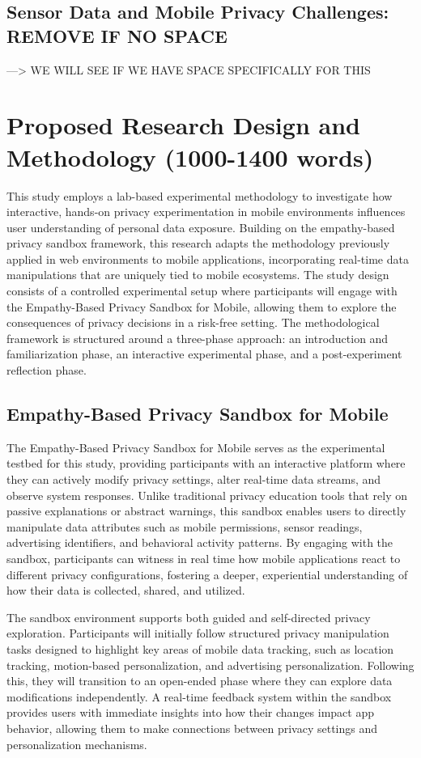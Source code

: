 \documentclass[acmlarge, nonacm]{acmart}
\begin{document}
\subsection{Sensor Data and Mobile Privacy Challenges: REMOVE IF NO SPACE}
 ---> WE WILL SEE IF WE HAVE SPACE SPECIFICALLY FOR THIS

\section{Proposed Research Design and Methodology (1000-1400 words)}
This study employs a lab-based experimental methodology to investigate how interactive, hands-on privacy experimentation in mobile environments influences user understanding of personal data exposure. Building on the empathy-based privacy sandbox framework, this research adapts the methodology previously applied in web environments to mobile applications, incorporating real-time data manipulations that are uniquely tied to mobile ecosystems. The study design consists of a controlled experimental setup where participants will engage with the Empathy-Based Privacy Sandbox for Mobile, allowing them to explore the consequences of privacy decisions in a risk-free setting. The methodological framework is structured around a three-phase approach: an introduction and familiarization phase, an interactive experimental phase, and a post-experiment reflection phase.

\subsection{Empathy-Based Privacy Sandbox for Mobile}

The Empathy-Based Privacy Sandbox for Mobile serves as the experimental testbed for this study, providing participants with an interactive platform where they can actively modify privacy settings, alter real-time data streams, and observe system responses. Unlike traditional privacy education tools that rely on passive explanations or abstract warnings, this sandbox enables users to directly manipulate data attributes such as mobile permissions, sensor readings, advertising identifiers, and behavioral activity patterns. By engaging with the sandbox, participants can witness in real time how mobile applications react to different privacy configurations, fostering a deeper, experiential understanding of how their data is collected, shared, and utilized.

The sandbox environment supports both guided and self-directed privacy exploration. Participants will initially follow structured privacy manipulation tasks designed to highlight key areas of mobile data tracking, such as location tracking, motion-based personalization, and advertising personalization. Following this, they will transition to an open-ended phase where they can explore data modifications independently. A real-time feedback system within the sandbox provides users with immediate insights into how their changes impact app behavior, allowing them to make connections between privacy settings and personalization mechanisms.
\end{document}
